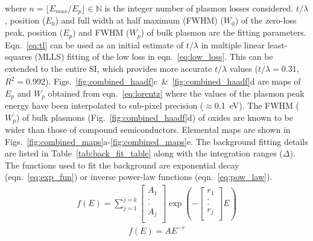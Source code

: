 \documentclass[%
aip,
rsi,%
 amsmath,amssymb,%
 reprint,%
]{revtex4-1}
\begin{document}
where $n = \lfloor E_{max}/E_p \rfloor \in \mathbb{N}$ is the integer number of plasmon losses considered. $t/\lambda$, position ($E_0$) and full width at half maximum (FWHM) ($W_0$) of the zero-loss peak, position ($E_p$) and FWHM ($W_p$) of bulk plasmon are the fitting parameters. Eqn.~\ref{eq:tl} can be used as an initial estimate of $t/\lambda$ in multiple linear least-squares (MLLS) fitting of the low loss in eqn.~\ref{eq:low_loss}. This can be extended to the entire SI, which provides more accurate $t/\lambda$ values ($\overline{t/\lambda}=$0.31,~$\overline{R^2}=$0.992). Figs.~\ref{fig:combined_haadf}c~\&~\ref{fig:combined_haadf}d are maps of $E_p$ and $W_p$ obtained from eqn.~\ref{eq:lorentz} where the values of the plasmon peak energy have been interpolated to sub-pixel precision ($\approx$0.1~eV). The FWHM  ($W_p$) of bulk plasmons (Fig.~\ref{fig:combined_haadf}d) of oxides are known to be wider than those of compound semiconductors. Elemental maps are shown in Figs.~\ref{fig:combined_maps}a-\ref{fig:combined_maps}e. The background fitting details are listed in Table~\ref{tab:back_fit_table} along with the integration ranges ($\Delta$). The functions used to fit the background are exponential decay (eqn.~\ref{eq:exp_fun}) or inverse power-law functions (eqn.~\ref{eq:pow_law}).
\begin{eqnarray}
	f(E) =
    \sum^{j=k}_{j=1}
    \left[
    \begin{array}{c}
    	A_1 	\\
        . 		\\
        . 		\\
        A_j 	\\
    \end{array}
    \right]
    \operatorname{exp}\left(-\left[
    \begin{array}{c}
    	r_1 	\\
        . 		\\
        . 		\\
        r_j 	\\
    \end{array}
    \right]E\right)
    \label{eq:exp_fun}
\end{eqnarray}
\begin{eqnarray}
	f(E) = AE^{-r}
    \label{eq:pow_law}
\end{eqnarray}
\end{document}
